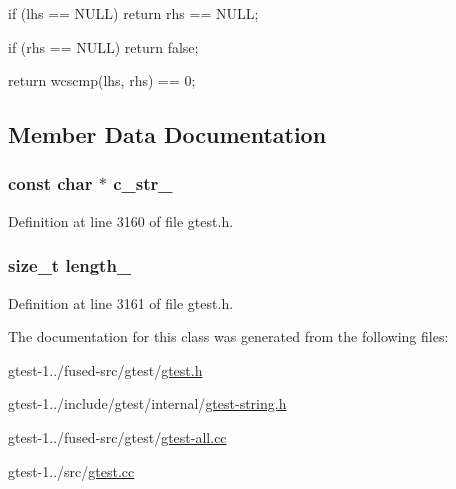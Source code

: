 \begin{DoxyCode}
                                                                       {
  if (lhs == NULL) return rhs == NULL;

  if (rhs == NULL) return false;

  return wcscmp(lhs, rhs) == 0;
}
\end{DoxyCode}


\subsection{\-Member \-Data \-Documentation}
\hypertarget{classtesting_1_1internal_1_1String_a4673846b2bf38c0a686f80d5cb598253}{
\subsubsection[{c\-\_\-str\-\_\-}]{\setlength{\rightskip}{0pt plus 5cm}const char $\ast$ {\bf c\-\_\-str\-\_\-}}}\label{d2/df8/classtesting_1_1internal_1_1String_a4673846b2bf38c0a686f80d5cb598253}


\-Definition at line 3160 of file gtest.\-h.

\hypertarget{classtesting_1_1internal_1_1String_af0c9b7dcc98dce1d0edf7cb6ce49103b}{
\subsubsection[{length\-\_\-}]{\setlength{\rightskip}{0pt plus 5cm}size\-\_\-t {\bf length\-\_\-}}}\label{d2/df8/classtesting_1_1internal_1_1String_af0c9b7dcc98dce1d0edf7cb6ce49103b}


\-Definition at line 3161 of file gtest.\-h.



\-The documentation for this class was generated from the following files\-:\begin{DoxyCompactItemize}
\item 
gtest-\/1../fused-\/src/gtest/\hyperlink{fused-src_2gtest_2gtest_8h}{gtest.\-h}\item 
gtest-\/1../include/gtest/internal/\hyperlink{gtest-string_8h}{gtest-\/string.\-h}\item 
gtest-\/1../fused-\/src/gtest/\hyperlink{fused-src_2gtest_2gtest-all_8cc}{gtest-\/all.\-cc}\item 
gtest-\/1../src/\hyperlink{gtest_8cc}{gtest.\-cc}\end{DoxyCompactItemize}
